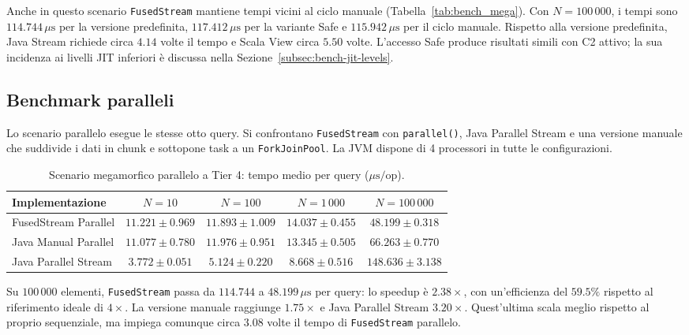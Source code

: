 \documentclass[a4paper,11pt]{report}
\theoremstyle{definition}
\begin{document}
Anche in questo scenario \texttt{FusedStream} mantiene tempi vicini al ciclo manuale (Tabella~\ref{tab:bench_mega}). Con $N = 100\,000$, i tempi sono $114.744\,\mu\text{s}$ per la versione predefinita, $117.412\,\mu\text{s}$ per la variante Safe e $115.942\,\mu\text{s}$ per il ciclo manuale. Rispetto alla versione predefinita, Java Stream richiede circa $4.14$ volte il tempo e Scala View circa $5.50$ volte. L'accesso Safe produce risultati simili con C2 attivo; la sua incidenza ai livelli JIT inferiori è discussa nella Sezione~\ref{subsec:bench-jit-levels}.

\subsection{Benchmark paralleli}
\label{subsec:bench-paralleli}

Lo scenario parallelo esegue le stesse otto query. Si confrontano \texttt{FusedStream} con \texttt{parallel()}, Java Parallel Stream e una versione manuale che suddivide i dati in chunk e sottopone task a un \texttt{ForkJoinPool}. La JVM dispone di 4 processori in tutte le configurazioni.

\begin{table}[htbp]
  \centering
  \caption{Scenario megamorfico parallelo a Tier 4: tempo medio per query ($\mu\text{s}/\text{op}$).}
  \label{tab:bench_par}
  \vspace{2mm}
  \small
  \setlength{\tabcolsep}{4pt}
  \begin{tabular}{lcccc}
    \toprule
    \textbf{Implementazione}      & \textbf{$N = 10$}  & \textbf{$N = 100$} & \textbf{$N = 1\,000$} & \textbf{$N = 100\,000$} \\
    \midrule
    \textsf{FusedStream Parallel} & $11.221 \pm 0.969$ & $11.893 \pm 1.009$ & $14.037 \pm 0.455$    & $48.199 \pm 0.318$      \\
    \textsf{Java Manual Parallel} & $11.077 \pm 0.780$ & $11.976 \pm 0.951$ & $13.345 \pm 0.505$    & $66.263 \pm 0.770$      \\
    \textsf{Java Parallel Stream} & $3.772 \pm 0.051$  & $5.124 \pm 0.220$  & $8.668 \pm 0.516$     & $148.636 \pm 3.138$     \\
    \bottomrule
  \end{tabular}
\end{table}

Su $100\,000$ elementi, \texttt{FusedStream} passa da $114.744$ a $48.199\,\mu\text{s}$ per query: lo speedup è $2.38\times$, con un'efficienza del $59.5\%$ rispetto al riferimento ideale di $4\times$. La versione manuale raggiunge $1.75\times$ e Java Parallel Stream $3.20\times$. Quest'ultima scala meglio rispetto al proprio sequenziale, ma impiega comunque circa $3.08$ volte il tempo di \texttt{FusedStream} parallelo.
\end{document}
